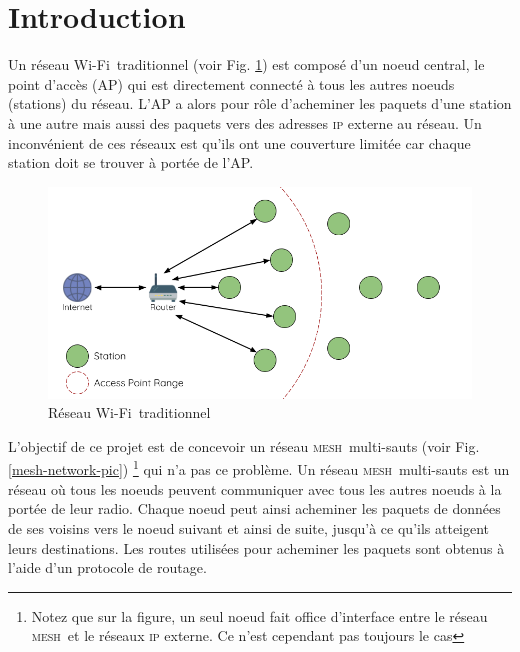 \documentclass[a4paper, 12pt]{report}
\newcommand{\mesh}{\textsc{mesh}}
\newcommand{\wifi}{Wi-Fi}
\begin{document}
\chapter*{Introduction}
    Un réseau \wifi\ traditionnel (voir Fig. \ref{traditional-network-pic}) est composé
    d'un noeud central, le point d'accès (AP) qui est
    directement connecté à tous les autres noeuds (stations) du réseau.
    L'AP a alors pour rôle d'acheminer les paquets d'une station à une autre
    mais aussi des paquets vers des adresses \textsc{ip} externe au réseau.
    Un inconvénient de ces réseaux est qu'ils ont une couverture limitée car chaque station
    doit se trouver à portée de l'AP.\\

    \begin{figure}[H]
        \centering
        \includegraphics[scale=0.4]{images/traditional-network-architecture.png}
        \caption{Réseau \wifi\ traditionnel \cite{esp-mesh_w}}
        \label{traditional-network-pic}
    \end{figure}

    L'objectif de ce projet est de concevoir un réseau \mesh\ multi-sauts (voir Fig. \ref{mesh-network-pic})
    \footnote{Notez que sur la figure, un seul noeud fait office d'interface
    entre le réseau \mesh\ et le réseaux \textsc{ip} externe. Ce n'est cependant pas toujours
    le cas} qui n'a pas ce problème. 
    Un réseau \mesh\ multi-sauts est un réseau où tous les noeuds peuvent communiquer avec tous les
    autres noeuds à la portée de leur radio. Chaque noeud peut ainsi acheminer
    les paquets de données de ses voisins vers le noeud suivant et ainsi de suite, jusqu'à ce qu'ils
    atteigent leurs destinations. Les routes utilisées pour acheminer les paquets sont obtenus à l'aide
    d'un protocole de routage.\\
\end{document}
